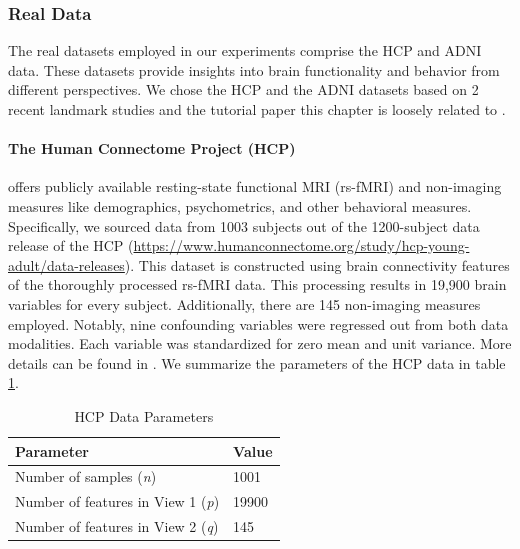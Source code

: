 \subsubsection{Real Data}

The real datasets employed in our experiments comprise the HCP and ADNI data.
These datasets provide insights into brain functionality and behavior from different perspectives.
We chose the HCP and the ADNI datasets based on 2 recent landmark studies and the tutorial paper this chapter is loosely related to \citep{mihalik2022canonical}.

\paragraph{The Human Connectome Project (HCP)} offers publicly available resting-state functional MRI (rs-fMRI) and non-imaging measures like demographics, psychometrics, and other behavioral measures.
Specifically, we sourced data from 1003 subjects out of the 1200-subject data release of the HCP (\url{https://www.humanconnectome.org/study/hcp-young-adult/data-releases}). This dataset is constructed using brain connectivity features of the thoroughly processed rs-fMRI data.
This processing results in 19,900 brain variables for every subject.
Additionally, there are 145 non-imaging measures employed.
Notably, nine confounding variables were regressed out from both data modalities.
Each variable was standardized for zero mean and unit variance.
More details can be found in \citep{smith2015positive, mihalik2022canonical}.
We summarize the parameters of the HCP data in table \ref{table:hcp-parameters}.

\begin{table}[h]
\centering
\caption{HCP Data Parameters}
\begin{tabular}{| l | l |}
\hline
\textbf{Parameter} & \textbf{Value} \\
\hline
Number of samples (\textit{n}) & 1001 \\
Number of features in View 1 (\textit{p}) & 19900 \\
Number of features in View 2 (\textit{q}) & 145 \\
\hline
\end{tabular}
\label{table:hcp-parameters}
\end{table}



